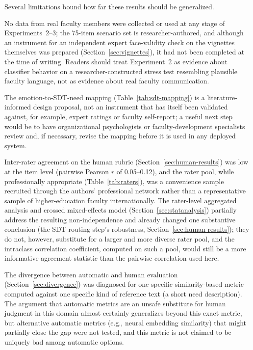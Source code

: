 \documentclass[higheredu,article,submit,pdftex,moreauthors]{Definitions/mdpi}
\begin{document}
Several limitations bound how far these results should be generalized.

No data from real faculty members were collected or used at any stage of Experiments~2--3; the 75-item scenario set is researcher-authored, and although an instrument for an independent expert face-validity check on the vignettes themselves was prepared (Section~\ref{sec:vignettes}), it had not been completed at the time of writing. Readers should treat Experiment~2 as evidence about classifier behavior on a researcher-constructed stress test resembling plausible faculty language, not as evidence about real faculty communication.

The emotion-to-SDT-need mapping (Table~\ref{tab:sdt-mapping}) is a literature-informed design proposal, not an instrument that has itself been validated against, for example, expert ratings or faculty self-report; a useful next step would be to have organizational psychologists or faculty-development specialists review and, if necessary, revise the mapping before it is used in any deployed system.

Inter-rater agreement on the human rubric (Section~\ref{sec:human-results}) was low at the item level (pairwise Pearson $r$ of 0.05--0.12), and the rater pool, while professionally appropriate (Table~\ref{tab:raters}), was a convenience sample recruited through the authors' professional network rather than a representative sample of higher-education faculty internationally. The rater-level aggregated analysis and crossed mixed-effects model (Section~\ref{sec:statanalysis}) partially address the resulting non-independence and already changed one substantive conclusion (the SDT-routing step's robustness, Section~\ref{sec:human-results}); they do not, however, substitute for a larger and more diverse rater pool, and the intraclass correlation coefficient, computed on such a pool, would still be a more informative agreement statistic than the pairwise correlation used here.

The divergence between automatic and human evaluation (Section~\ref{sec:divergence}) was diagnosed for one specific similarity-based metric computed against one specific kind of reference text (a short need description). The argument that automatic metrics are an unsafe substitute for human judgment in this domain almost certainly generalizes beyond this exact metric, but alternative automatic metrics (e.g., neural embedding similarity) that might partially close the gap were not tested, and this metric is not claimed to be uniquely bad among automatic options.
\end{document}
